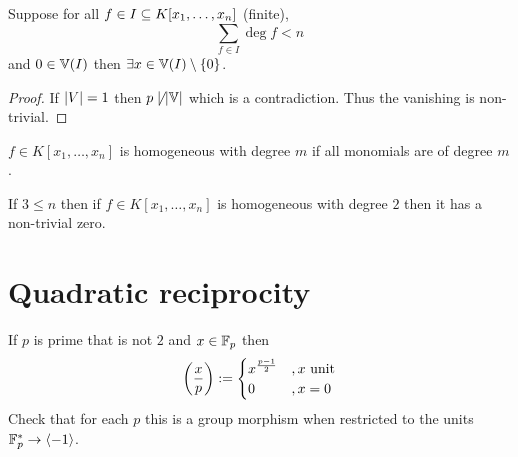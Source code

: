 \begin{cor}
    Suppose for all $f \in I \subseteq K[x_1, \dots , x_n]$ (finite), 
    \[\sum_{f \in I} \deg f < n\]
    and $0 \in \mathbb{V}(I)$ then $\exists x \in \mathbb{V}(I) \setminus \left\{0\right\}$.
\end{cor}
\begin{proof}
    If $\left\vert V \right\vert = 1$ then $p \not \mid \left\vert \mathbb{V} \right\vert$ which is a contradiction.
    Thus the vanishing is non-trivial.
\end{proof}

\begin{dfn}[Homogeneous]
    $f \in K[x_1, \dots , x_n]$ is homogeneous with degree $m$ 
    if all monomials are of degree $m$.
\end{dfn}

\begin{cor}
    If $3 \le n$ then if $f \in K[x_1, \dots , x_n]$ 
    is homogeneous with degree $2$ then it has a non-trivial zero.
\end{cor}

\section{Quadratic reciprocity}

\begin{dfn}
    If $p$ is prime that is not $2$ and $x \in \mathbb{F}_p$ then
    \[\left(\frac{x}{p}\right) := 
    \begin{cases}
        x^{\frac{p-1}{2}} &, x \text{ unit}\\
        0 &, x = 0
    \end{cases}\]
    Check that for each $p$ this is a group morphism 
    when restricted to the units
    $\mathbb{F}_p^* \to \langle-1\rangle$.
\end{dfn}

